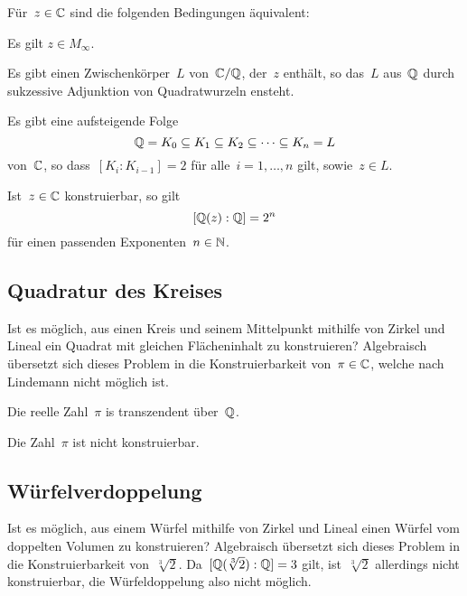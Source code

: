 \begin{theorem}
  Für~$z \in \mathbb{C}$ sind die folgenden Bedingungen äquivalent:
  \begin{equivlist}
    \item
      Es gilt $z \in M_{\infty}$.
    \item
      Es gibt einen Zwischenkörper~$L$ von~$\mathbb{C}/\mathbb{Q}$, der~$z$ enthält, so das~$L$ aus~$\mathbb{Q}$ durch sukzessive Adjunktion von Quadratwurzeln ensteht.
    \item
      Es gibt eine aufsteigende Folge
      \[
        \mathbb{Q} = K_0 \subseteq K_1 \subseteq K_2 \subseteq \dotsb \subseteq K_n = L
      \]
      von~$\mathbb{C}$, so dass~$[K_i : K_{i-1}] = 2$ für alle~$i = 1, \dotsc, n$ gilt, sowie~$z \in L$.
  \end{equivlist}
\end{theorem}

\begin{corollary}
  Ist~$z \in \mathbb{C}$ konstruierbar, so gilt
  \[
    [\mathbb{Q}(z) : \mathbb{Q}] = 2^n
  \] 
  für einen passenden Exponenten~$n \in \mathbb{N}$.
\end{corollary}



\subsection{Quadratur des Kreises}

Ist es möglich, aus einen Kreis und seinem Mittelpunkt mithilfe von Zirkel und Lineal ein Quadrat mit gleichen Flächeninhalt zu konstruieren?
Algebraisch übersetzt sich dieses Problem in die Konstruierbarkeit von~$\pi \in \mathbb{C}$, welche nach Lindemann nicht möglich ist.

\begin{theorem}[Lindemann]
  Die reelle Zahl~$\pi$ is transzendent über~$\mathbb{Q}$.
\end{theorem}

\begin{corollary}
  Die Zahl~$\pi$ ist nicht konstruierbar.
\end{corollary}



\subsection{Würfelverdoppelung}

Ist es möglich, aus einem Würfel mithilfe von Zirkel und Lineal einen Würfel vom doppelten Volumen zu konstruieren?
Algebraisch übersetzt sich dieses Problem in die Konstruierbarkeit von~$\sqrt[3]{2}$.
Da~$[\mathbb{Q}( \sqrt[3]{2} ) : \mathbb{Q}] = 3$ gilt, ist~$\sqrt[3]{2}$ allerdings nicht konstruierbar, die Würfeldoppelung also nicht möglich.



